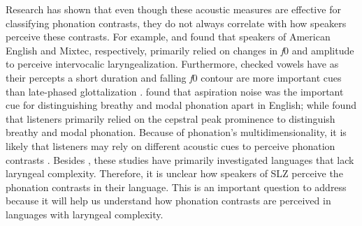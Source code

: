 Research has shown that even though these acoustic measures are effective for classifying phonation contrasts, they do not always correlate with how speakers perceive these contrasts. For example, \citet{hillenbrandRoleF0Amplitude1996} and \citet{gerfenProductionPerceptionLaryngealized2005} found that speakers of American English and Mixtec, respectively, primarily relied on changes in \textit{f}0 and amplitude to perceive intervocalic laryngealization. Furthermore, checked vowels have as their percepts a short duration and falling \textit{f}0 contour are more important cues than late-phased glottalization \citep{brunelleTonePerceptionSgaw2011,chaiPhoneticsPhonologyChecked2022,chaiPerceptionCheckedRearticulated2025,garellekVoiceQualityTone2013}. \citet{klattAnalysisSynthesisPerception1990} found that aspiration noise was the important cue for distinguishing breathy and modal phonation apart in English; while \citet{hillenbrandAcousticCorrelatesBreathy1996} found that listeners primarily relied on the cepstral peak prominence to distinguish breathy and modal phonation. Because of phonation's multidimensionality, it is likely that listeners may rely on different acoustic cues to perceive phonation contrasts \citep{espositoEffectsLinguisticExperience2010,kreimanUnifiedTheoryVoice2014,kreimanValidatingPsychoacousticModel2021}. Besides \citet{gerfenProductionPerceptionLaryngealized2005}, these studies have primarily investigated languages that lack laryngeal complexity. Therefore, it is unclear how speakers of SLZ perceive the phonation contrasts in their language. This is an important question to address because it will help us understand how phonation contrasts are perceived in languages with laryngeal complexity.






